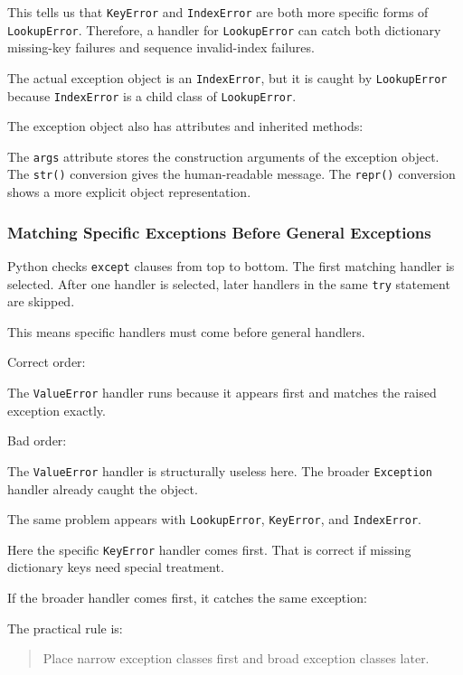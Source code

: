 This tells us that \texttt{KeyError} and \texttt{IndexError} are both more specific forms of \texttt{LookupError}. Therefore, a handler for \texttt{LookupError} can catch both dictionary missing-key failures and sequence invalid-index failures.

The actual exception object is an \texttt{IndexError}, but it is caught by \texttt{LookupError} because \texttt{IndexError} is a child class of \texttt{LookupError}.

The exception object also has attributes and inherited methods:

The \texttt{args} attribute stores the construction arguments of the exception object. The \texttt{str()} conversion gives the human-readable message. The \texttt{repr()} conversion shows a more explicit object representation.

\subsubsection{Matching Specific Exceptions Before General Exceptions}

Python checks \texttt{except} clauses from top to bottom. The first matching handler is selected. After one handler is selected, later handlers in the same \texttt{try} statement are skipped.

This means specific handlers must come before general handlers.

Correct order:

The \texttt{ValueError} handler runs because it appears first and matches the raised exception exactly.

Bad order:

The \texttt{ValueError} handler is structurally useless here. The broader \texttt{Exception} handler already caught the object.

The same problem appears with \texttt{LookupError}, \texttt{KeyError}, and \texttt{IndexError}.

Here the specific \texttt{KeyError} handler comes first. That is correct if missing dictionary keys need special treatment.

If the broader handler comes first, it catches the same exception:

The practical rule is:

\begin{quote}
Place narrow exception classes first and broad exception classes later.
\end{quote}

